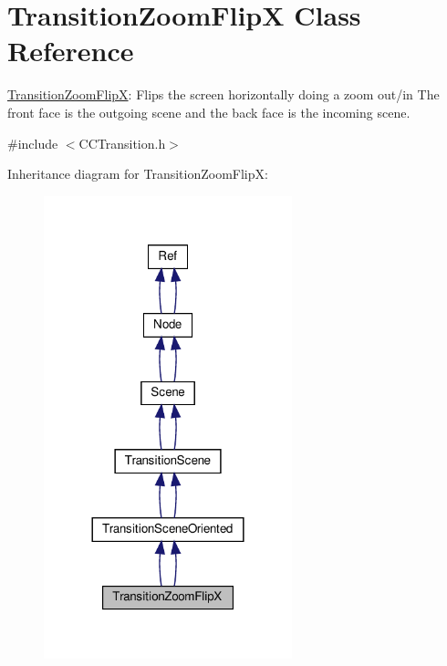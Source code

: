 \hypertarget{classTransitionZoomFlipX}{}\section{Transition\+Zoom\+FlipX Class Reference}
\label{classTransitionZoomFlipX}


\hyperlink{classTransitionZoomFlipX}{Transition\+Zoom\+FlipX}\+: Flips the screen horizontally doing a zoom out/in The front face is the outgoing scene and the back face is the incoming scene.  




{\ttfamily \#include $<$C\+C\+Transition.\+h$>$}



Inheritance diagram for Transition\+Zoom\+FlipX\+:
\nopagebreak
\begin{figure}[H]
\begin{center}
\leavevmode
\includegraphics[width=204pt]{classTransitionZoomFlipX__inherit__graph}
\end{center}
\end{figure}


